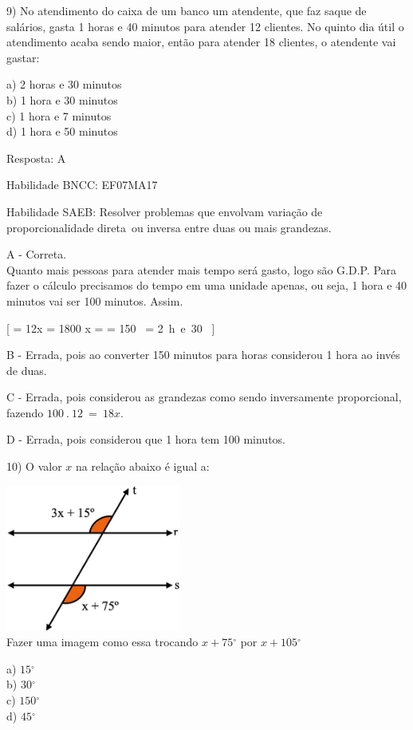 9) No atendimento do caixa de um banco um atendente, que faz saque de
salários, gasta 1 horas e 40 minutos para atender 12 clientes. No quinto
dia útil o atendimento acaba sendo maior, então para atender 18
clientes, o atendente vai gastar:

a) 2 horas e 30 minutos\\
b) 1 hora e 30 minutos\\
c) 1 hora e 7 minutos\\
d) 1 hora e 50 minutos

Resposta: A

Habilidade BNCC: EF07MA17

Habilidade SAEB: Resolver problemas que envolvam variação de
proporcionalidade direta~ou inversa entre duas ou mais grandezas.

A - Correta.\\
Quanto mais pessoas para atender mais tempo será gasto, logo são G.D.P.
Para fazer o cálculo precisamos do tempo em uma unidade apenas, ou seja,
1 hora e 40 minutos vai ser 100 minutos. Assim.

[ =  \rightarrow 12x = 1800 \rightarrow x =  = 150\  = 2\ h\ e\ 30\ 
]

B - Errada, pois ao converter 150 minutos para horas considerou 1 hora
ao invés de duas.

C - Errada, pois considerou as grandezas como sendo inversamente
proporcional, fazendo \(100\ .\ 12\  = \ 18x\).

D - Errada, pois considerou que 1 hora tem 100 minutos.

10) O valor \(x\) na relação abaixo é igual a:

\includegraphics[width=2.27083in,height=1.89583in]{./imgSAEB_7_MAT/media/image106.png}\\
Fazer uma imagem como essa trocando \(x + 75{^\circ}\) por
\(x + 105{^\circ}\)

a) \(15{^\circ}\)\\
b) \(30{^\circ}\)\\
c) \(150{^\circ}\)\\
d) \(45{^\circ}\)

